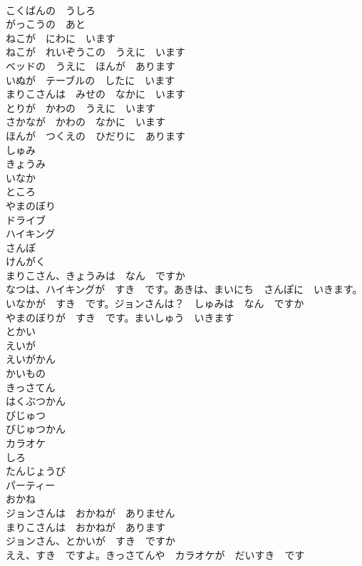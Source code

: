 \documentclass[8pt]{extreport}
\begin{document}
\begin{CJK}{UTF8}{min}
\\	こくばんの　うしろ	
\\	がっこうの　あと	
\\	ねこが　にわに　います	
\\	ねこが　れいぞうこの　うえに　います	
\\	ベッドの　うえに　ほんが　あります	
\\	いぬが　テーブルの　したに　います	
\\	まりこさんは　みせの　なかに　います	
\\	とりが　かわの　うえに　います	
\\	さかなが　かわの　なかに　います	
\\	ほんが　つくえの　ひだりに　あります	
\\	しゅみ	
\\	きょうみ	
\\	いなか	
\\	ところ	
\\	やまのぼり	
\\	ドライブ	
\\	ハイキング	
\\	さんぽ	
\\	けんがく	
\\	まりこさん、きょうみは　なん　ですか	
\\	なつは、ハイキングが　すき　です。あきは、まいにち　さんぽに　いきます。いなかが　すき　です。ジョンさんは？　しゅみは　なん　ですか	
\\	やまのぼりが　すき　です。まいしゅう　いきます	
\\	とかい	
\\	えいが	
\\	えいがかん	
\\	かいもの	
\\	きっさてん	
\\	はくぶつかん	
\\	びじゅつ	
\\	びじゅつかん	
\\	カラオケ	
\\	しろ	
\\	たんじょうび	
\\	パーティー	
\\	おかね	
\\	ジョンさんは　おかねが　ありません	
\\	まりこさんは　おかねが　あります	
\\	ジョンさん、とかいが　すき　ですか	
\\	ええ、すき　ですよ。きっさてんや　カラオケが　だいすき　です	

\end{CJK}
\end{document}
